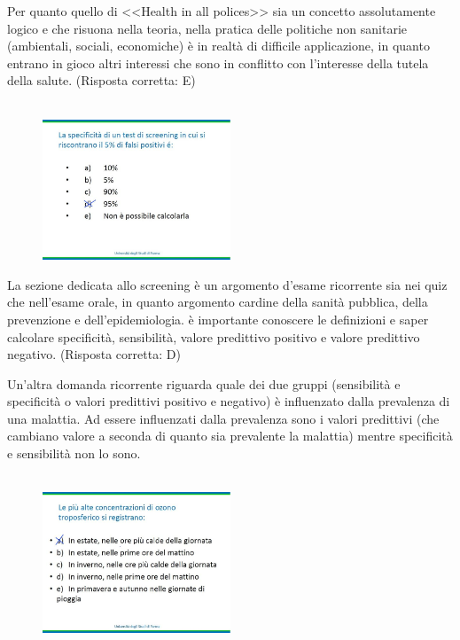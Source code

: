 Per quanto quello di \textless{}\textless{}Health in all
polices\textgreater{}\textgreater{} sia un concetto assolutamente logico
e che risuona nella teoria, nella pratica delle politiche non sanitarie
(ambientali, sociali, economiche) è in realtà di difficile applicazione,
in quanto entrano in gioco altri interessi che sono in conflitto con
l'interesse della tutela della salute. (Risposta corretta: E)
\\\\
\begin{figure}[!ht]
\centering
	\includegraphics[width=0.5\textwidth]{25/image4.jpeg}
	\end{figure}

La sezione dedicata allo screening è un argomento d'esame ricorrente sia
nei quiz che nell'esame orale, in quanto argomento cardine della sanità
pubblica, della prevenzione e dell'epidemiologia. è importante conoscere
le definizioni e saper calcolare specificità, sensibilità, valore
predittivo positivo e valore predittivo negativo. (Risposta corretta: D)

Un'altra domanda ricorrente riguarda quale dei due gruppi (sensibilità e
specificità o valori predittivi positivo e negativo) è influenzato dalla
prevalenza di una malattia. Ad essere influenzati dalla prevalenza sono
i valori predittivi (che cambiano valore a seconda di quanto sia
prevalente la malattia) mentre specificità e sensibilità non lo sono.
\\\\
\begin{figure}[!ht]
\centering
	\includegraphics[width=0.5\textwidth]{25/image5.jpeg}
	\end{figure}


